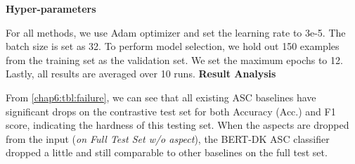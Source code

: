 \textbf{Hyper-parameters}

For all methods, we use Adam optimizer and set the learning rate to 3e-5. The batch size is set as 32.
To perform model selection, we hold out 150 examples from the training set as the validation set.
We set the maximum epochs to 12.
Lastly, all results are averaged over 10 runs.
\textbf{Result Analysis}

From \ref{chap6:tbl:failure}, %
we can see that all existing ASC baselines have significant drops on the contrastive test set for both Accuracy (Acc.) and F1 score, indicating the hardness of this testing set.
When the aspects are dropped from the input (\emph{on Full Test Set w/o aspect}), the BERT-DK ASC classifier dropped a little and still comparable to other baselines on the full test set.

